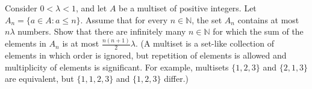 Consider $0<\lambda<1$,  and let $A$ be a multiset of positive integers.  Let $A_n=\{a\in A: a\leq n\}$.  Assume that for every $n\in\mathbb{N}$,  the set $A_n$ contains at most $n\lambda$ numbers.  Show that there are infinitely many $n\in\mathbb{N}$ for which the sum of the elements in $A_n$ is at most $\frac{n(n+1)}{2}\lambda$.  (A multiset is a set-like collection of elements in which order is ignored, but repetition of elements is allowed and multiplicity of elements is significant.  For example, multisets $\{1, 2, 3\}$ and $\{2, 1, 3\}$ are equivalent, but $\{1, 1, 2, 3\}$ and $\{1, 2, 3\}$ differ.)